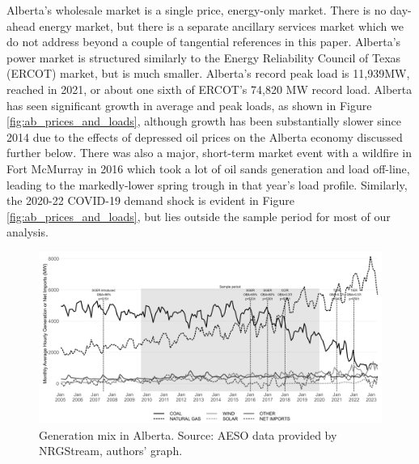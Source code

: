\documentclass[12pt]{article}
\begin{document}
Alberta's wholesale market is a single price, energy-only market. There is no day-ahead energy market, but there is a separate ancillary services market which we do not address beyond a couple of tangential references in this paper. Alberta's power market is structured similarly to the Energy Reliability Council of Texas (ERCOT) market, but is much smaller. Alberta's record peak load is 11,939MW, reached in 2021, or about one sixth of ERCOT's 74,820 MW record load. Alberta has seen significant growth in average and peak loads, as shown in Figure \ref{fig:ab_prices_and_loads}, although growth has been substantially slower since 2014 due to the effects of depressed oil prices on the Alberta economy discussed further below. There was also a major, short-term market event with a wildfire in Fort McMurray in 2016 which took a lot of oil sands generation and load off-line, leading to the markedly-lower spring trough in that year's load profile. Similarly, the 2020-22 COVID-19 demand shock is evident in Figure \ref{fig:ab_prices_and_loads}, but lies outside the sample period for most of our analysis.

\begin{figure}[th]%
	\centering \vspace{-.25cm} \includegraphics[width=6.5in]{../images/gen_fuel_policies.png}
\vspace{-0.75cm}	\caption{Generation mix in Alberta.  Source: AESO data provided by NRGStream, authors' graph.}
\label{fig:gen_mix}
\end{figure}
\end{document}
